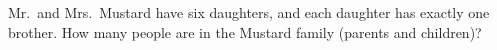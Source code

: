 Mr.\ and Mrs.\ Mustard have six daughters, and each daughter has exactly one brother. How many people are in the Mustard family (parents and children)?
